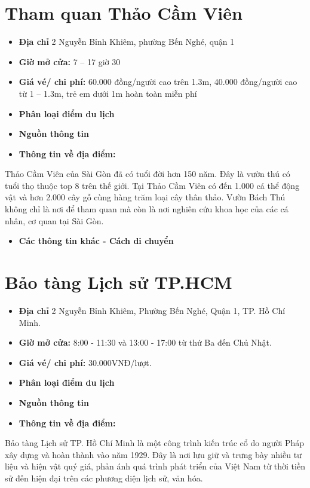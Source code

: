 \documentclass{article}
\begin{document}
\section{Tham quan Thảo Cầm Viên}
\begin{itemize}
    \item{\textbf{Địa chỉ}} 2 Nguyễn Bỉnh Khiêm, phường Bến Nghé, quận 1
    \item{\textbf{Giờ mở cửa:}} 7 – 17 giờ 30
    \item{\textbf{Giá vé/ chi phí:}} 60.000 đồng/người cao trên 1.3m, 40.000 đồng/người cao từ 1 – 1.3m, trẻ em dưới 1m hoàn toàn miễn phí
    \item{\textbf{Phân loại điểm du lịch} }
    \item{\textbf{Nguồn thông tin}}
    \item{\textbf{Thông tin về địa điểm:}}
\end{itemize}

Thảo Cầm Viên của Sài Gòn đã có tuổi đời hơn 150 năm. Đây là vườn thú có tuổi thọ thuộc top 8 trên thế giới. Tại Thảo Cầm Viên có đến 1.000 cá thể động vật và hơn 2.000 cây gỗ cùng hàng trăm loại cây thân thảo. Vườn Bách Thú không chỉ là nơi để tham quan mà còn là nơi nghiên cứu khoa học của các cá nhân, cơ quan tại Sài Gòn.

\begin{itemize}
    \item{\textbf{Các thông tin khác - Cách di chuyển}}
\end{itemize}

\section{Bảo tàng Lịch sử TP.HCM}
\begin{itemize}
    \item{\textbf{Địa chỉ}} 2 Nguyễn Bỉnh Khiêm, Phường Bến Nghé, Quận 1, TP. Hồ Chí Minh.
    \item{\textbf{Giờ mở cửa:}} 8:00 - 11:30 và 13:00 - 17:00 từ thứ Ba đến Chủ Nhật.
    \item{\textbf{Giá vé/ chi phí:}} 30.000VNĐ/lượt.
    \item{\textbf{Phân loại điểm du lịch} }
    \item{\textbf{Nguồn thông tin}}
    \item{\textbf{Thông tin về địa điểm:}}
\end{itemize}
Bảo tàng Lịch sử TP. Hồ Chí Minh là một công trình kiến trúc cổ do người Pháp xây dựng và hoàn thành vào năm 1929. Đây là nơi lưu giữ và trưng bày nhiều tư liệu và hiện vật quý giá, phản ánh quá trình phát triển của Việt Nam từ thời tiền sử đến hiện đại trên các phương diện lịch sử, văn hóa.
\end{document}
